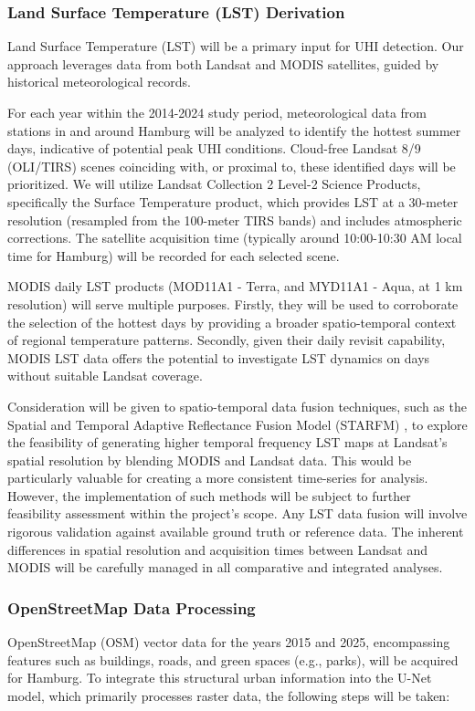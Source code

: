 \documentclass{article}
\begin{document}
\subsubsection{Land Surface Temperature (LST) Derivation}
Land Surface Temperature (LST) will be a primary input for UHI detection. Our approach leverages data from both Landsat and MODIS satellites, guided by historical meteorological records.

For each year within the 2014-2024 study period, meteorological data from stations in and around Hamburg will be analyzed to identify the hottest summer days, indicative of potential peak UHI conditions. Cloud-free Landsat 8/9 (OLI/TIRS) scenes coinciding with, or proximal to, these identified days will be prioritized. We will utilize Landsat Collection 2 Level-2 Science Products, specifically the Surface Temperature product, which provides LST at a 30-meter resolution (resampled from the 100-meter TIRS bands) and includes atmospheric corrections. The satellite acquisition time (typically around 10:00-10:30 AM local time for Hamburg) will be recorded for each selected scene.

MODIS daily LST products (MOD11A1 - Terra, and MYD11A1 - Aqua, at 1 km resolution) will serve multiple purposes. Firstly, they will be used to corroborate the selection of the hottest days by providing a broader spatio-temporal context of regional temperature patterns. Secondly, given their daily revisit capability, MODIS LST data offers the potential to investigate LST dynamics on days without suitable Landsat coverage.

Consideration will be given to spatio-temporal data fusion techniques, such as the Spatial and Temporal Adaptive Reflectance Fusion Model (STARFM) \parencite{GaoSTARFM2006}, to explore the feasibility of generating higher temporal frequency LST maps at Landsat's spatial resolution by blending MODIS and Landsat data. This would be particularly valuable for creating a more consistent time-series for analysis. However, the implementation of such methods will be subject to further feasibility assessment within the project's scope. Any LST data fusion will involve rigorous validation against available ground truth or reference data. The inherent differences in spatial resolution and acquisition times between Landsat and MODIS will be carefully managed in all comparative and integrated analyses.

\subsubsection{OpenStreetMap Data Processing}
OpenStreetMap (OSM) vector data for the years 2015 and 2025, encompassing features such as buildings, roads, and green spaces (e.g., parks), will be acquired for Hamburg. To integrate this structural urban information into the U-Net model, which primarily processes raster data, the following steps will be taken:
\end{document}
